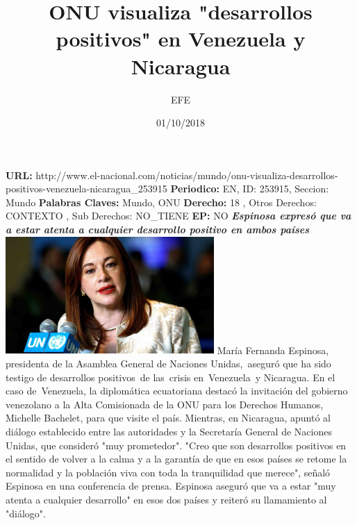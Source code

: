 \documentclass{article}%
\title{\textbf{ONU visualiza "desarrollos positivos" en Venezuela y Nicaragua}}%
\author{EFE}%
\date{01/10/2018}%
\begin{document}
%
\normalsize%
\maketitle%
\textbf{URL: }%
http://www.el{-}nacional.com/noticias/mundo/onu{-}visualiza{-}desarrollos{-}positivos{-}venezuela{-}nicaragua\_253915\newline%
%
\textbf{Periodico: }%
EN, %
ID: %
253915, %
Seccion: %
Mundo\newline%
%
\textbf{Palabras Claves: }%
Mundo, ONU\newline%
%
\textbf{Derecho: }%
18%
, Otros Derechos: %
CONTEXTO%
, Sub Derechos: %
NO\_TIENE%
\newline%
%
\textbf{EP: }%
NO\newline%
\newline%
%
\textbf{\textit{Espinosa expresó que va a estar atenta a cualquier desarrollo positivo en ambos países}}%
\newline%
\newline%
%
\includegraphics[width=300px]{202.jpg}%
\newline%
%
María Fernanda Espinosa, presidenta de la Asamblea General de Naciones Unidas,~aseguró que ha sido testigo de desarrollos positivos~de las~crisis en~Venezuela~y Nicaragua.%
\newline%
%
En el caso de~Venezuela, la diplomática ecuatoriana destacó la invitación del gobierno venezolano a la Alta Comisionada de la ONU para los Derechos Humanos, Michelle Bachelet, para que visite el país.%
\newline%
%
Mientras, en Nicaragua, apuntó al diálogo establecido entre las autoridades y la Secretaría General de Naciones Unidas, que consideró "muy prometedor".%
\newline%
%
"Creo que son desarrollos positivos en el sentido de volver a la calma y a la garantía de que en esos países se retome la normalidad y la población viva con toda la tranquilidad que merece", señaló Espinosa en una conferencia de prensa.%
\newline%
%
Espinosa aseguró que va a estar "muy atenta a cualquier desarrollo" en esos dos países y reiteró su llamamiento al "diálogo".%
\newline%
%
\end{document}

